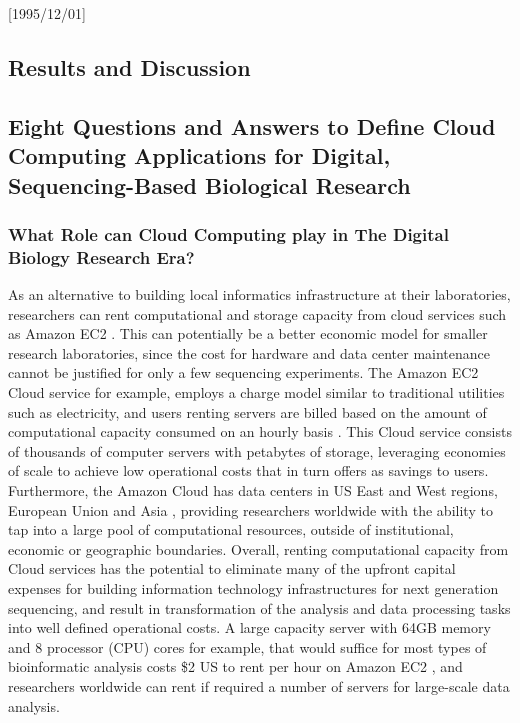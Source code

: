 \NeedsTeXFormat{LaTeX2e}[1995/12/01] \documentclass[10pt]{bmc_article}
\newenvironment{bmcformat}{\begin{raggedright}\baselineskip20pt\sloppy\setboolean{publ}{false}}{\end{raggedright}\baselineskip20pt\sloppy}
\begin{document}
\begin{bmcformat}

\section*{Results and Discussion}
\subsection*{Eight Questions and Answers to Define Cloud Computing Applications for Digital, Sequencing-Based Biological Research} 

\subsubsection*{What Role can Cloud Computing play in The Digital Biology Research Era?}

As an alternative to building local informatics infrastructure at their laboratories, researchers can rent 
computational and storage capacity from cloud services such as Amazon EC2 \cite{awsec2}. This can potentially be
a better economic model for smaller research laboratories, since the cost for hardware and data center 
maintenance cannot be justified for only a few sequencing experiments. The Amazon EC2 Cloud service for example, 
employs a charge model similar to traditional utilities such as electricity, and users 
renting servers are billed based on the amount of computational capacity consumed on an hourly basis \cite{ec2price}. 
This Cloud service consists of thousands of computer servers with petabytes of storage, leveraging economies of 
scale to achieve low operational costs that in turn offers as savings to users. Furthermore, the Amazon Cloud 
has data centers in US East and West regions, European Union and Asia \cite{ec2regions}, providing researchers 
worldwide with the ability to tap into a large pool of computational resources, outside of institutional, 
economic or geographic boundaries. Overall, renting computational capacity from Cloud services has the 
potential to eliminate many of the upfront capital expenses for building information technology infrastructures 
for next generation sequencing, and result in transformation of the analysis and data processing tasks into well 
defined operational costs. A large capacity server with 64GB memory and 8 processor 
(CPU) cores for example, that would suffice for most types of bioinformatic analysis costs \$2 US to rent per hour 
on Amazon EC2 \cite{ec2price}, and researchers worldwide can rent if required a number of servers for large-scale 
data analysis. 


\end{bmcformat}
\end{document}
